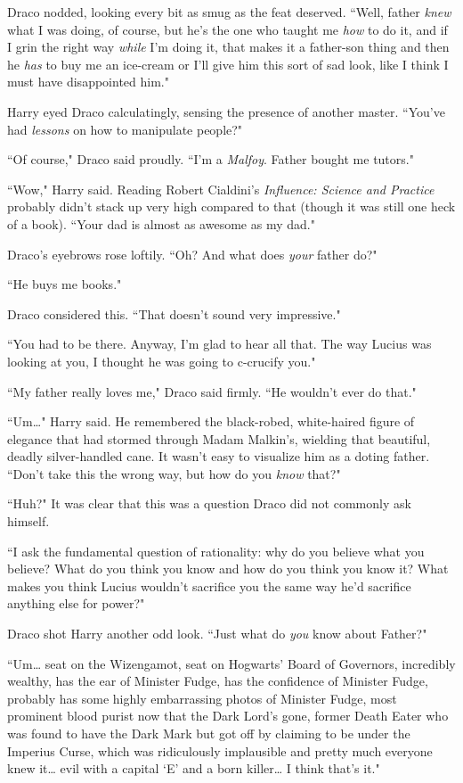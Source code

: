 Draco nodded, looking every bit as smug as the feat deserved. ``Well, father \emph{knew} what I was doing, of course, but he's the one who taught me \emph{how} to do it, and if I grin the right way \emph{while} I'm doing it, that makes it a father-son thing and then he \emph{has} to buy me an ice-cream or I'll give him this sort of sad look, like I think I must have disappointed him."

Harry eyed Draco calculatingly, sensing the presence of another master. ``You've had \emph{lessons} on how to manipulate people?"

``Of course," Draco said proudly. ``I'm a \emph{Malfoy}. Father bought me tutors."

``Wow," Harry said. Reading Robert Cialdini's \emph{Influence: Science and Practice} probably didn't stack up very high compared to that (though it was still one heck of a book). ``Your dad is almost as awesome as my dad."

Draco's eyebrows rose loftily. ``Oh? And what does \emph{your} father do?"

``He buys me books."

Draco considered this. ``That doesn't sound very impressive."

``You had to be there. Anyway, I'm glad to hear all that. The way Lucius was looking at you, I thought he was going to c-crucify you."

``My father really loves me," Draco said firmly. ``He wouldn't ever do that."

``Um{\ldots}" Harry said. He remembered the black-robed, white-haired figure of elegance that had stormed through Madam Malkin's, wielding that beautiful, deadly silver-handled cane. It wasn't easy to visualize him as a doting father. ``Don't take this the wrong way, but how do you \emph{know} that?"

``Huh?" It was clear that this was a question Draco did not commonly ask himself.

``I ask the fundamental question of rationality: why do you believe what you believe? What do you think you know and how do you think you know it? What makes you think Lucius wouldn't sacrifice you the same way he'd sacrifice anything else for power?"

Draco shot Harry another odd look. ``Just what do \emph{you} know about Father?"

``Um{\ldots} seat on the Wizengamot, seat on Hogwarts' Board of Governors, incredibly wealthy, has the ear of Minister Fudge, has the confidence of Minister Fudge, probably has some highly embarrassing photos of Minister Fudge, most prominent blood purist now that the Dark Lord's gone, former Death Eater who was found to have the Dark Mark but got off by claiming to be under the Imperius Curse, which was ridiculously implausible and pretty much everyone knew it{\ldots} evil with a capital `E' and a born killer{\ldots} I think that's it."

